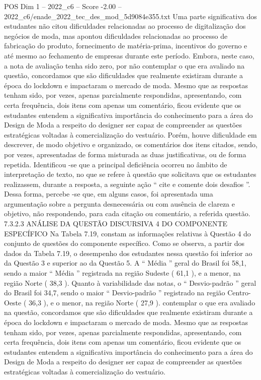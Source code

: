 \begin{textsample}{POS Dim 1 – 2022\_c6 – Score -2.00 – 2022\_c6/enade\_2022\_tec\_des\_mod\_5d9084e355.txt}
Uma parte significativa dos estudantes não citou dificuldades relacionadas ao processo de digitalização dos negócios de moda, mas apontou dificuldades relacionadas ao processo de fabricação do produto, fornecimento de matéria-prima, incentivos do governo e até mesmo ao fechamento de empresas durante este período.
Embora, neste caso, a nota de avaliação tenha sido zero, por não contemplar o que era avaliado na questão, concordamos que são dificuldades que realmente existiram durante a época do lockdown e impactaram o mercado de moda.
Mesmo que as respostas tenham sido, por vezes, apenas parcialmente respondidas, apresentando, com certa frequência, dois itens com apenas um comentário, ficou evidente que os estudantes entendem a significativa importância do conhecimento para a área do Design de Moda a respeito do designer ser capaz de compreender as questões estratégicas voltadas à comercialização do vestuário.
Porém, houve dificuldade em descrever, de modo objetivo e organizado, os comentários dos itens citados, sendo, por vezes, apresentadas de forma misturada as duas justificativas, ou de forma repetida.
Identificou -se que a principal deficiência ocorreu no âmbito de interpretação de texto, no que se refere à questão que solicitava que os estudantes realizassem, durante a resposta, a seguinte ação “ cite e comente dois desafios ”.
Dessa forma, percebe -se que, em alguns casos, foi apresentada uma argumentação sobre a pergunta desnecessária ou com ausência de clareza e objetivo, não respondendo, para cada citação ou comentário, a referida questão. 7.3.2.3 ANÁLISE DA QUESTÃO DISCURSIVA 4 DO COMPONENTE ESPECÍFICO Na Tabela 7.19, constam as informações relativas à Questão 4 do conjunto de questões do componente específico.
Como se observa, a partir dos dados da Tabela 7.19, o desempenho dos estudantes nessa questão foi inferior ao da Questão 3 e superior ao da Questão 5.
A “ Média ” geral do Brasil foi 58,1, sendo a maior “ Média ” registrada na região Sudeste ( 61,1 ), e a menor, na região Norte ( 38,3 ).
Quanto à variabilidade das notas, o “ Desvio-padrão ” geral do Brasil foi 34,7, sendo o maior “ Desvio-padrão ” registrado na região Centro-Oeste ( 36,3 ), e o menor, na região Norte ( 27,9 ). contemplar o que era avaliado na questão, concordamos que são dificuldades que realmente existiram durante a época do lockdown e impactaram o mercado de moda.
Mesmo que as respostas tenham sido, por vezes, apenas parcialmente respondidas, apresentando, com certa frequência, dois itens com apenas um comentário, ficou evidente que os estudantes entendem a significativa importância do conhecimento para a área do Design de Moda a respeito do designer ser capaz de compreender as questões estratégicas voltadas à comercialização do vestuário.

\end{textsample}
